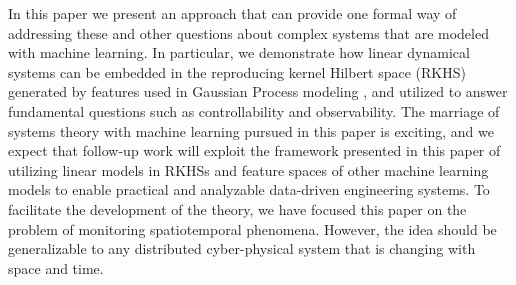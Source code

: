 In this paper we present an approach that can provide one formal way of addressing these and other questions about complex systems that are modeled with machine learning. In particular, we demonstrate how linear dynamical systems can be embedded in the reproducing kernel Hilbert space (RKHS) \cite{schoelkopf01kernelbased,ams:cucker,kingravi2012reproducing} generated by features used in Gaussian Process modeling \cite{Liu2018csmtutorial,rasmussen2006gaussian}, %
and utilized to answer fundamental questions such as controllability and observability. The marriage of systems theory with machine learning pursued in this paper is exciting, and %
 we expect that follow-up work will exploit the framework presented in this paper of utilizing linear models in RKHSs and feature spaces of other machine learning models to enable practical and analyzable data-driven engineering systems. To facilitate the development of the theory, we have focused this paper on the problem of monitoring spatiotemporal phenomena. However, the idea should be generalizable to any distributed cyber-physical system that is changing with space and time. %
